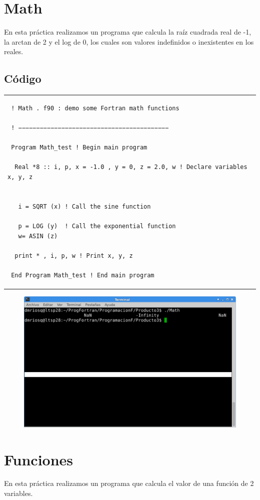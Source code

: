 \documentclass[10pt]{article}
\begin{document}
\section{Math}
En esta práctica realizamos un programa que calcula la raíz cuadrada real de -1, la arctan de 2 y el log de 0, los cuales son valores indefinidos o inexistentes en los reales.

\subsection{Código}
\begin{tabular}{l}
\begin{verbatim}  
 ! Math . f90 : demo some Fortran math functions

 ! −−−−−−−−−−−−−−−−−−−−−−−−−−−−−−−−−−−−−−−−−−

 Program Math_test ! Begin main program

  Real *8 :: i, p, x = -1.0 , y = 0, z = 2.0, w ! Declare variables x, y, z

 
   i = SQRT (x) ! Call the sine function

   p = LOG (y)  ! Call the exponential function
   w= ASIN (z)

  print * , i, p, w ! Print x, y, z

 End Program Math_test ! End main program 
\end{verbatim}
\end{tabular}


\begin{figure}
  \centering
    \includegraphics[scale=0.4]{M}
\end{figure}


\section{Funciones}
En esta práctica realizamos un programa que calcula el valor de una función de 2 variables.
\end{document}

